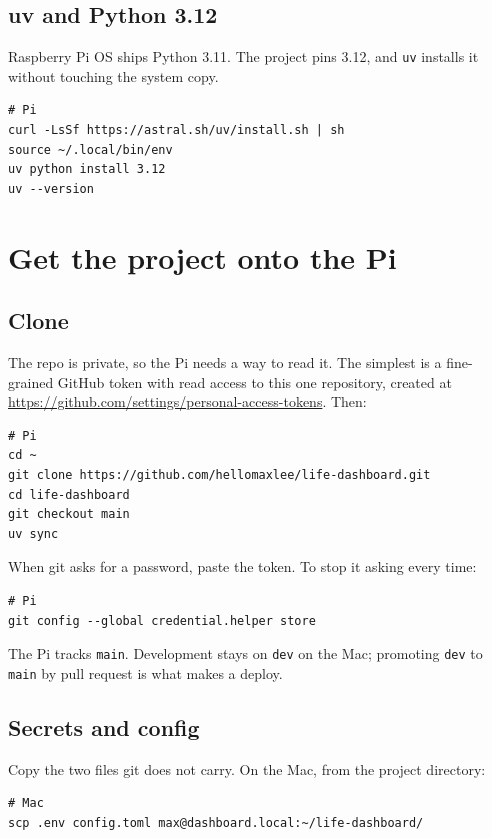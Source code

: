 \documentclass[11pt,letterpaper]{article}
\newcommand{\cmd}[1]{\texttt{#1}}
\begin{document}
\subsection{uv and Python 3.12}

Raspberry Pi OS ships Python 3.11. The project pins 3.12, and \cmd{uv} installs it without touching the system copy.

\begin{lstlisting}
# Pi
curl -LsSf https://astral.sh/uv/install.sh | sh
source ~/.local/bin/env
uv python install 3.12
uv --version
\end{lstlisting}

\section{Get the project onto the Pi}

\subsection{Clone}

The repo is private, so the Pi needs a way to read it. The simplest is a fine-grained GitHub token with read access to this one repository, created at \url{https://github.com/settings/personal-access-tokens}. Then:

\begin{lstlisting}
# Pi
cd ~
git clone https://github.com/hellomaxlee/life-dashboard.git
cd life-dashboard
git checkout main
uv sync
\end{lstlisting}

When git asks for a password, paste the token. To stop it asking every time:

\begin{lstlisting}
# Pi
git config --global credential.helper store
\end{lstlisting}

The Pi tracks \cmd{main}. Development stays on \cmd{dev} on the Mac; promoting \cmd{dev} to \cmd{main} by pull request is what makes a deploy.

\subsection{Secrets and config}

Copy the two files git does not carry. On the Mac, from the project directory:

\begin{lstlisting}
# Mac
scp .env config.toml max@dashboard.local:~/life-dashboard/
\end{lstlisting}
\end{document}
